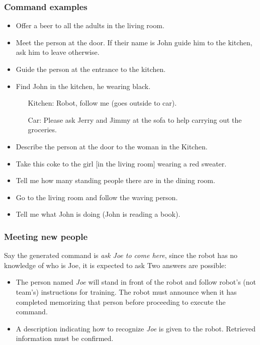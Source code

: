 \subsubsection{Command examples}
\begin{itemize}
	\item Offer a beer to all the adults in the living room.
	\item Meet the person at the door. If their name is John guide him to the kitchen, ask him to leave otherwise.
	\item Guide the person at the entrance to the kitchen.
	\item Find John in the kitchen, he wearing black.
	\begin{itemize}
		\item[Kitchen:] Robot, follow me (goes outside to car).
		\item[Car:] Please ask Jerry and Jimmy at the sofa to help carrying out the groceries.
	\end{itemize}
	\item Describe the person at the door to the woman in the Kitchen.
	\item Take this coke to the girl [in the living room] wearing a red sweater.
	\item Tell me how many standing people there are in the dining room.
	\item Go to the living room and follow the waving person.
	\item Tell me what John is doing (John is reading a book).
\end{itemize}

\subsubsection{Meeting new people}
Say the generated command is \textit{ask Joe to come here}, since the robot has no knowledge of who is Joe, it is expected to ask  Two answers are possible:
\begin{itemize}
	\item {} The person named \textit{Joe} will stand in front of the robot and follow robot's (not team's) instructions for training. The robot must announce when it has completed memorizing that person before proceeding to execute the command.
	\item {} A description indicating how to recognize \textit{Joe} is given to the robot. Retrieved information must be confirmed.
\end{itemize}


